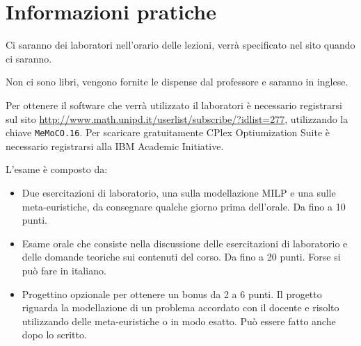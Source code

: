 \section{Informazioni pratiche}

Ci saranno dei laboratori nell'orario delle lezioni, verrà specificato nel sito quando ci saranno.

Non ci sono libri, vengono fornite le dispense dal professore e saranno in inglese.

Per ottenere il software che verrà utilizzato il laboratori è necessario registrarsi sul sito \url{http://www.math.unipd.it/userlist/subscribe/?idlist=277}, utilizzando la chiave \texttt{MeMoCO.16}. Per scaricare gratuitamente CPlex Optiumization Suite è necessario registrarsi alla IBM Academic Initiative.

L'esame è composto da:

\begin{itemize}
	\item Due esercitazioni di laboratorio, una sulla modellazione MILP e una sulle meta-euristiche, da consegnare qualche giorno prima dell'orale. Da fino a 10 punti.
	\item Esame orale che consiste nella discussione delle esercitazioni di laboratorio e delle domande teoriche sui contenuti del corso. Da fino a 20 punti. Forse si può fare in italiano.
	\item Progettino opzionale per ottenere un bonus da 2 a 6 punti. Il progetto riguarda la modellazione di un problema accordato con il docente e risolto utilizzando delle meta-euristiche o in modo esatto. Può essere fatto anche dopo lo scritto.
\end{itemize}


